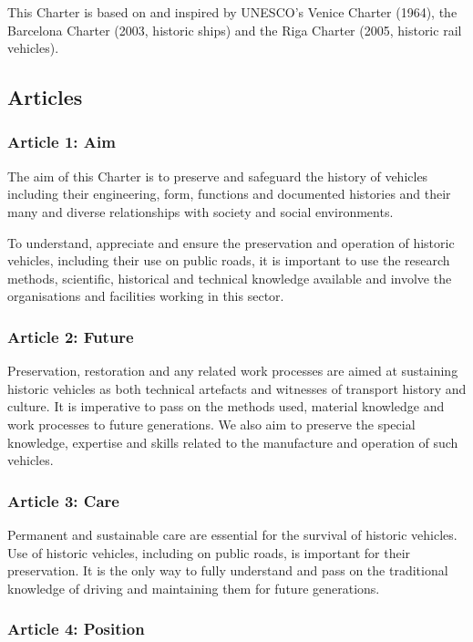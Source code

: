\documentclass[12pt]{article}
\begin{document}
This Charter is based on and inspired by UNESCO’s Venice Charter (1964), the Barcelona Charter (2003, historic ships) and the Riga Charter (2005, historic rail vehicles). 


\subsection{Articles}

\subsubsection{Article 1: Aim}

The aim of this Charter is to preserve and safeguard the history of vehicles including their engineering, form, functions and documented histories and their many and diverse relationships with society and social environments.

To understand, appreciate and ensure the preservation and operation of historic vehicles, including their use on public roads, it is important to use the research methods, scientific, historical and technical knowledge available and involve the organisations and facilities working in this sector.


\subsubsection{Article 2: Future}

Preservation, restoration and any related work processes are aimed at sustaining historic vehicles as both technical artefacts and witnesses of transport history and culture. It is imperative to pass on the methods used, material knowledge and work processes to future generations. We also aim to preserve the special knowledge, expertise and skills related to the manufacture and operation of such vehicles.


\subsubsection{Article 3: Care}

Permanent and sustainable care are essential for the survival of historic vehicles. Use of historic vehicles, including on public roads, is important for their preservation. It is the only way to fully understand and pass on the traditional knowledge of driving and maintaining them for future generations.


\subsubsection{Article 4: Position}
\end{document}
